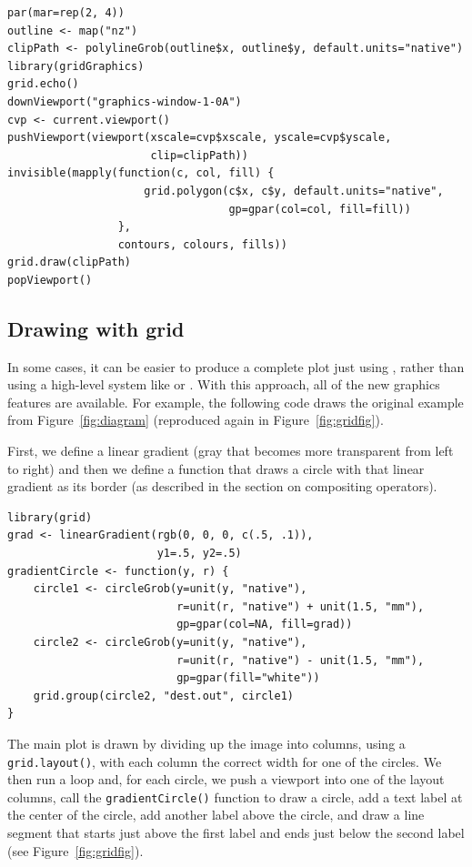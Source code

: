 \begin{verbatim}
par(mar=rep(2, 4))
outline <- map("nz")
clipPath <- polylineGrob(outline$x, outline$y, default.units="native")
library(gridGraphics)
grid.echo()
downViewport("graphics-window-1-0A")
cvp <- current.viewport()
pushViewport(viewport(xscale=cvp$xscale, yscale=cvp$yscale,
                      clip=clipPath))                      
invisible(mapply(function(c, col, fill) {
                     grid.polygon(c$x, c$y, default.units="native", 
                                  gp=gpar(col=col, fill=fill))
                 },
                 contours, colours, fills))
grid.draw(clipPath)
popViewport()
\end{verbatim}

\hypertarget{drawing-with-grid}{%
\subsection{Drawing with grid}\label{drawing-with-grid}}

In some cases, it can be easier to produce a complete plot
just using , rather than using a high-level system
like  or .
With this approach, all of the new graphics features
are available. For example, the following code draws the original example
from Figure~\ref{fig:diagram} (reproduced again in
Figure~\ref{fig:gridfig}).

First, we define a linear gradient (gray that becomes more transparent from
left to right) and then we define a function that draws a circle
with that linear gradient as its border (as described in the section
on compositing operators).

\begin{verbatim}
library(grid)
grad <- linearGradient(rgb(0, 0, 0, c(.5, .1)),
                       y1=.5, y2=.5)
gradientCircle <- function(y, r) {
    circle1 <- circleGrob(y=unit(y, "native"),
                          r=unit(r, "native") + unit(1.5, "mm"), 
                          gp=gpar(col=NA, fill=grad))
    circle2 <- circleGrob(y=unit(y, "native"),
                          r=unit(r, "native") - unit(1.5, "mm"), 
                          gp=gpar(fill="white"))
    grid.group(circle2, "dest.out", circle1)
}
\end{verbatim}

The main plot is drawn by dividing up the image into columns, using
a \texttt{grid.layout()}, with each
column the correct width for one of the circles.
We then run a loop and, for each circle, we push a viewport into
one of the layout columns, call the \texttt{gradientCircle()} function to
draw a circle, add a text label at the
center of the circle, add another label above the circle, and
draw a line segment that starts just above the first label and ends just below
the second label (see Figure~\ref{fig:gridfig}).

